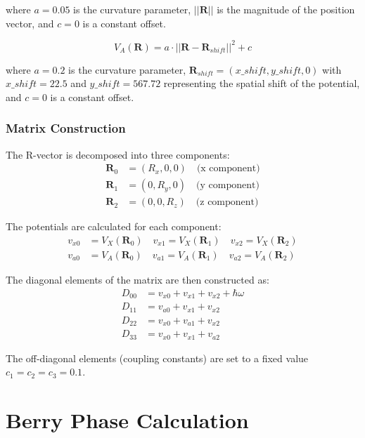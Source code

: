 \documentclass{article}
\begin{document}
where $a = 0.05$ is the curvature parameter, $||\mathbf{R}||$ is the magnitude of the position vector, and $c = 0$ is a constant offset.

\begin{equation}
V_A(\mathbf{R}) = a \cdot ||\mathbf{R} - \mathbf{R}_{shift}||^2 + c
\end{equation}

where $a = 0.2$ is the curvature parameter, $\mathbf{R}_{shift} = (x\_shift, y\_shift, 0)$ with $x\_shift = 22.5$ and $y\_shift = 567.72$ representing the spatial shift of the potential, and $c = 0$ is a constant offset.

\subsubsection{Matrix Construction}

The R-vector is decomposed into three components:
\begin{align}
\mathbf{R}_0 &= (R_x, 0, 0) \quad \text{(x component)} \\
\mathbf{R}_1 &= (0, R_y, 0) \quad \text{(y component)} \\
\mathbf{R}_2 &= (0, 0, R_z) \quad \text{(z component)}
\end{align}

The potentials are calculated for each component:
\begin{align}
v_{x0} &= V_X(\mathbf{R}_0) \quad v_{x1} = V_X(\mathbf{R}_1) \quad v_{x2} = V_X(\mathbf{R}_2) \\
v_{a0} &= V_A(\mathbf{R}_0) \quad v_{a1} = V_A(\mathbf{R}_1) \quad v_{a2} = V_A(\mathbf{R}_2)
\end{align}

The diagonal elements of the matrix are then constructed as:
\begin{align}
D_{00} &= v_{x0} + v_{x1} + v_{x2} + \hbar\omega \\
D_{11} &= v_{a0} + v_{x1} + v_{x2} \\
D_{22} &= v_{x0} + v_{a1} + v_{x2} \\
D_{33} &= v_{x0} + v_{x1} + v_{a2}
\end{align}

The off-diagonal elements (coupling constants) are set to a fixed value $c_1 = c_2 = c_3 = 0.1$.

\section{Berry Phase Calculation}
\end{document}
